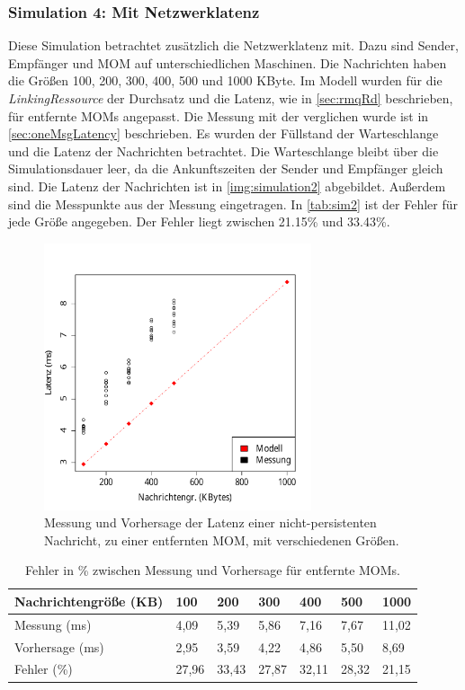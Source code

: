 \subsubsection{Simulation 4: Mit Netzwerklatenz} 
Diese Simulation betrachtet zusätzlich die Netzwerklatenz mit. Dazu sind Sender, Empfänger und MOM auf unterschiedlichen Maschinen. Die Nachrichten haben die Größen 100, 200, 300, 400, 500 und 1000 KByte. Im Modell wurden für die \emph{LinkingRessource} der Durchsatz und die Latenz, wie in \autoref{sec:rmqRd} beschrieben, für entfernte MOMs angepasst. Die Messung mit der verglichen wurde ist in \autoref{sec:oneMsgLatency} beschrieben. Es wurden der Füllstand der Warteschlange und die Latenz der Nachrichten betrachtet. 
Die Warteschlange bleibt über die Simulationsdauer leer, da die Ankunftszeiten der Sender und Empfänger gleich sind. Die Latenz der Nachrichten ist in \autoref{img:simulation2} abgebildet. Außerdem sind die Messpunkte aus der Messung eingetragen. In \autoref{tab:sim2} ist der Fehler für jede Größe angegeben. Der Fehler liegt zwischen 21.15\% und 33.43\%.
\begin{figure}
\center
  \includegraphics[width=0.7\textwidth]{images/modelSimulationResults/simulation2.pdf}
  \caption{Messung und Vorhersage der Latenz einer nicht-persistenten Nachricht, zu einer entfernten MOM, mit verschiedenen Größen.}
  \label{img:simulation2}
\end{figure}

\begin{table}[t]
\centering
  \begin{tabular}{| l | l | l | l |l | l | l |}
    \hline
    Nachrichtengröße (KB) & 100 & 200 & 300 & 400 & 500 & 1000 \\ \hline
    Messung (ms) & 4,09 & 5,39 & 5,86 & 7,16 & 7,67 & 11,02\\ \hline
    Vorhersage (ms) & 2,95 & 3,59 & 4,22 & 4,86 & 5,50 & 8,69\\ \hline
    Fehler (\%) & 27,96 & 33,43 & 27,87 & 32,11 & 28,32 & 21,15\\ \hline
    
    \hline
      \end{tabular}
	\caption{\label{tab:sim2} Fehler in \% zwischen Messung und Vorhersage für entfernte MOMs.}
\end{table}



